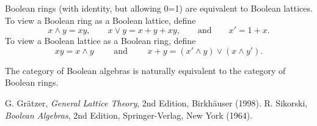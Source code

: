 \documentclass[12pt]{article}
\begin{document}
Boolean rings (with identity, but allowing 0=1) are equivalent to Boolean lattices. To view a Boolean ring as a Boolean lattice, define $$x \land y = xy,\qquad x \lor y = x + y + xy,\qquad\mbox{and}\qquad x'=1+x.$$ To view a Boolean lattice as a Boolean ring, define $$xy = x \land y\qquad\mbox{ and }\qquad x + y = (x' \land y) \lor (x \land y').$$

The category of Boolean algebras is naturally equivalent to the category of Boolean rings.

\begin{thebibliography}{8}
 G. Gr\"{a}tzer, {\em General Lattice Theory}, 2nd Edition, Birkh\"{a}user (1998).
 R. Sikorski, {\em Boolean Algebras}, 2nd Edition, Springer-Verlag, New York (1964).
\end{thebibliography}
\end{document}
